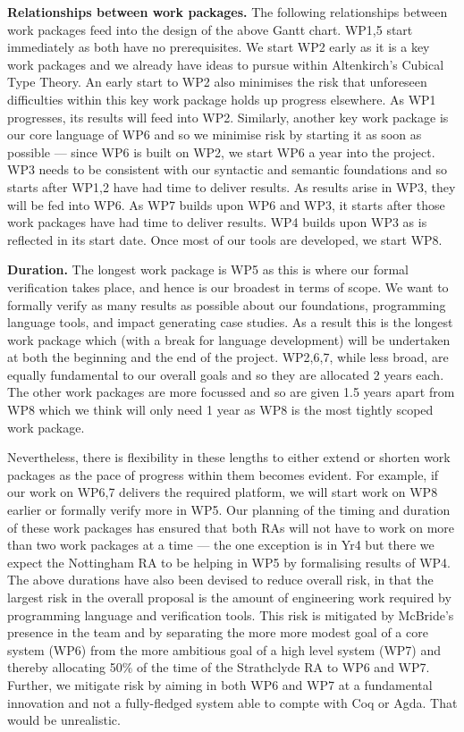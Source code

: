\documentclass[a4paper,11pt]{article}
\begin{document}
\bigskip

{\bf Relationships between work packages.} The following 
relationships between work packages feed into the design of the above
Gantt chart. WP1,5 start immediately as both have no prerequisites. We
start WP2 early as it is a key work packages and we already have
ideas to pursue within Altenkirch's Cubical Type Theory. An early
start to WP2 also minimises the risk that unforeseen difficulties
within this key work package holds up progress elsewhere. As WP1
progresses, its results will feed into WP2. Similarly, another key
work package is our core language of WP6 and so we minimise risk by
starting it as soon as possible --- since WP6 is built on WP2, we
start WP6 a year into the project. WP3 needs to be consistent with our
syntactic and semantic foundations and so starts after WP1,2 have had
time to deliver results. As results arise in WP3, they will be fed
into WP6. As WP7 builds upon WP6 and WP3, it starts after those work
packages have had time to deliver results. WP4 builds upon WP3 as is
reflected in its start date. Once most of our tools are
developed, we start WP8.

{\bf Duration.} The longest work package is WP5 as this is where our
formal verification takes place, and hence is our broadest in terms of
scope. We want to formally verify as many results as possible about
our foundations, programming language tools, and impact generating
case studies.  As a result this is the longest work package which
(with a break for language development) will be undertaken at both the
beginning and the end of the project. WP2,6,7, while less broad, are
equally fundamental to our overall goals and so they are allocated 2
years each. The other work packages are more focussed and
so are given 1.5 years apart from WP8 which we think will only need 1
year as WP8 is the most tightly scoped work package.

Nevertheless, there is flexibility in these lengths to either extend
or shorten work packages as the pace of progress within them becomes
evident. For example, if our work on WP6,7 delivers the required
platform, we will start work on WP8 earlier or formally verify more in
WP5.  Our planning of the timing and duration of these work packages
has ensured that both RAs will not have to work on more than two work
packages at a time --- the one exception is in Yr4 but
there we expect the Nottingham RA to be helping in WP5 by formalising
results of WP4. The above durations have also been
devised to reduce overall risk, in that the largest risk in the
overall proposal is the amount of engineering work required by
programming language and verification tools. This risk is mitigated by
McBride's presence in the team and by separating the
more more modest goal of a core system (WP6) from the more ambitious
goal of a high level system (WP7) and thereby allocating 50$\%$ of the
time of the Strathclyde RA to WP6 and WP7. Further, we mitigate risk 
by aiming in both WP6 and WP7 at a fundamental innovation and not a
fully-fledged system able to compte with Coq or Agda. That would be unrealistic.
\end{document}
